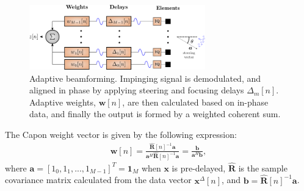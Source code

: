 \documentclass[journal]{IEEEtran}
\newcommand{\mat}[1]{\mathbf{#1}}
\renewcommand{\vec}[1]{\mathbf{#1}}
\begin{document}

\begin{figure}
\centerline{\includegraphics[width=3in]{gfx/beamforming_mv_lowres.png}}
\caption{Adaptive beamforming. Impinging signal is demodulated, and aligned in phase by applying steering and focusing delays $\Delta_m[n]$. Adaptive weights, $\vec{w}[n]$, are then calculated based on in-phase data, and finally the output is formed by a weighted coherent sum.}
\label{fig:mvbf}
\end{figure}

The Capon weight vector is given by the following expression:
\begin{align}\label{eq:w}
\vec{w}[n] = \frac{\mat{\hat{R}}[n]^{-1}\vec{a}}{\vec{a}^H\mat{\hat{R}}[n]^{-1}\vec{a}} = \frac{\vec{b}}{\vec{a}^H\vec{b}},
\end{align}
where $\vec{a} = [1_0, 1_1, ..., 1_{M-1}]^T = \vec{1}_M$ when $\vec{x}$ is pre-delayed, $\mat{\hat{R}}$ is the sample covariance matrix calculated from the data vector $\vec{x}^\Delta[n]$, and $\vec{b} = \mat{\hat{R}}[n]^{-1}\vec{a}$. 
\end{document}
